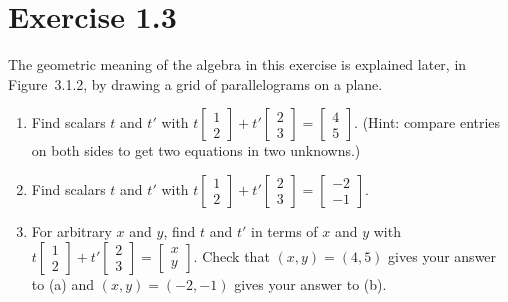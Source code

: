 \section*{Exercise 1.3}
\begin{exercise}
The geometric meaning of the algebra in this exercise is explained later, in
Figure~3.1.2, by drawing a grid of parallelograms on a plane.
\begin{enumerate}
  \item Find scalars $t$ and $t'$ with
        $t\begin{bmatrix} 1 \\ 2 \end{bmatrix}
        + t'\begin{bmatrix} 2 \\ 3 \end{bmatrix}
        = \begin{bmatrix} 4 \\ 5 \end{bmatrix}$.
        (Hint: compare entries on both sides to get two equations in two unknowns.)
  \item Find scalars $t$ and $t'$ with
        $t\begin{bmatrix} 1 \\ 2 \end{bmatrix}
        + t'\begin{bmatrix} 2 \\ 3 \end{bmatrix}
        = \begin{bmatrix} -2 \\ -1 \end{bmatrix}$.
  \item For arbitrary $x$ and $y$, find $t$ and $t'$ in terms of $x$ and $y$ with
        $t\begin{bmatrix} 1 \\ 2 \end{bmatrix}
        + t'\begin{bmatrix} 2 \\ 3 \end{bmatrix}
        = \begin{bmatrix} x \\ y \end{bmatrix}$.
        Check that $(x,y) = (4,5)$ gives your answer to (a) and
        $(x,y) = (-2,-1)$ gives your answer to (b).
\end{enumerate}
\end{exercise}

